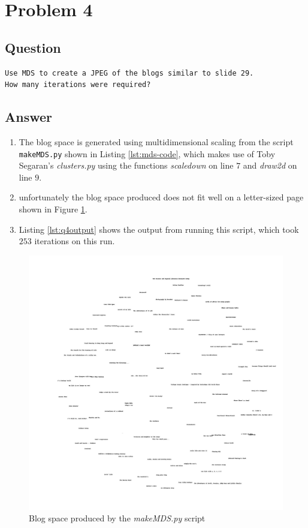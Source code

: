 \section{Problem 4}
\label{part4}
\subsection*{Question}
\begingroup
\begin{verbatim}
Use MDS to create a JPEG of the blogs similar to slide 29.  
How many iterations were required?
\end{verbatim}
\subsection{Answer}
\begin{enumerate}
\item The blog space is generated using multidimensional scaling from the script \verb+makeMDS.py+ shown in Listing \ref{lst:mds-code}, which makes use of Toby Segaran's \emph{clusters.py} using the functions \emph{scaledown} on line $7$ and \emph{draw2d} on line $9$.




\item unfortunately the blog space produced does not fit well on a letter-sized page shown in Figure \ref{fig:q4MDS}.
\item Listing \ref{lst:q4output} shows the output from running this script, which took $253$ iterations on this run.
\end{enumerate}
\newpage
\begin{figure}[h]
\centerline{\includegraphics[scale=0.26]{questions/q4/blogs2d.jpg}}
\caption{Blog space produced by the \emph{makeMDS.py} script}
\label{fig:q4MDS}
\end{figure}


\newpage
